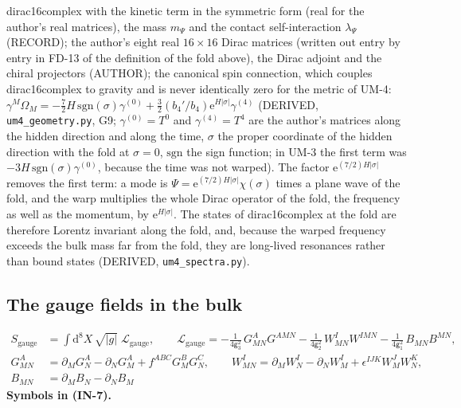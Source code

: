 \documentclass[
  10pt,
]{article}
\begin{document}
dirac16complex with the kinetic term in the symmetric form (real for the
author's real matrices), the mass \(m_\Psi\) and the contact
self-interaction \(\lambda_\Psi\) (RECORD); the author's eight real
\(16 \times 16\) Dirac matrices (written out entry by entry in FD-13 of
the definition of the fold above), the Dirac adjoint and the chiral
projectors (AUTHOR); the canonical spin connection, which couples
dirac16complex to gravity and is never identically zero for the metric
of UM-4:
\(\gamma^M\Omega_M = -\frac72H\,\mathrm{sgn}(\sigma)\gamma^{(0)} + \frac32(b_4'/b_4)\mathrm{e}^{H\lvert\sigma\rvert}\gamma^{(4)}\)
(DERIVED, \texttt{um4\_geometry.py}, G9; \(\gamma^{(0)} = T^0\) and
\(\gamma^{(4)} = T^4\) are the author's matrices along the hidden
direction and along the time, \(\sigma\) the proper coordinate of the
hidden direction with the fold at \(\sigma = 0\), \(\mathrm{sgn}\) the
sign function; in UM-3 the first term was
\(-3H\,\mathrm{sgn}(\sigma)\gamma^{(0)}\), because the time was not
warped). The factor \(\mathrm{e}^{(7/2)H\lvert\sigma\rvert}\) removes
the first term: a mode is
\(\Psi = \mathrm{e}^{(7/2)H\lvert\sigma\rvert}\chi(\sigma)\) times a
plane wave of the fold, and the warp multiplies the whole Dirac operator
of the fold, the frequency as well as the momentum, by
\(\mathrm{e}^{H\lvert\sigma\rvert}\). The states of dirac16complex at
the fold are therefore Lorentz invariant along the fold, and, because
the warped frequency exceeds the bulk mass far from the fold, they are
long-lived resonances rather than bound states (DERIVED,
\texttt{um4\_spectra.py}).

\hypertarget{the-gauge-fields-in-the-bulk}{%
\subsection{The gauge fields in the
bulk}\label{the-gauge-fields-in-the-bulk}}

\[
\begin{aligned}
S_{\mathrm{gauge}} &= \int\mathrm{d}^8X\,\sqrt{\lvert g\rvert}\;\mathcal{L}_{\mathrm{gauge}},\qquad
\mathcal{L}_{\mathrm{gauge}} = -\frac{1}{4\mathsf{g}_3^2}\,G^A_{MN}G^{AMN} - \frac{1}{4\mathsf{g}_2^2}\,W^I_{MN}W^{IMN}
 - \frac{1}{4\mathsf{g}_1^2}\,B_{MN}B^{MN},\\
G^A_{MN} &= \partial_MG^A_N - \partial_NG^A_M + f^{ABC}G^B_MG^C_N,\qquad
W^I_{MN} = \partial_MW^I_N - \partial_NW^I_M + \epsilon^{IJK}W^J_MW^K_N,\\
B_{MN} &= \partial_MB_N - \partial_NB_M
\end{aligned} \tag{IN-7}
\] \textbf{Symbols in (IN-7).}
\end{document}
